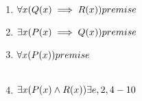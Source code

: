 \documentclass[12pt]{article}
\begin{document}
\begin{table}[H]
\begin{enumerate}
\item $ \forall x (Q(x) \implies R(x)) \hfill  premise$
\item $ \exists x (P(x) \implies Q(x)) \hfill  premise$
\item $ \forall x (P(x)) \hfill   premise$\\
\begin{tabular}{|p{10cm}|}
\hline
\item $ P(c) \implies Q(c) \hfill   assumed $
\item $ P(c) \hfill   \forall e,3$
\item $ Q(c) \hfill   \implies e,4,5$
\item $ Q(c) \implies R(c) \hfill   \forall e,1$
\item $ R(c) \hfill   \implies e,6,7$
\item $ P(c) \land R(c) \hfill   \land i,5,8$
\item $ \exists x (P(x) \land R(x))  \hfill   \exists i,9$\\
\hline
\end{tabular}
\item $ \exists x (P(x) \land R(x)) \hfill   \exists e,2,4-10$
\end{enumerate}
\end{table}
\end{document}
